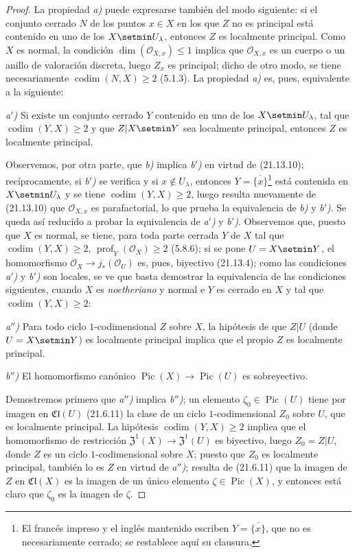 \begin{proof}
La propiedad \emph{a)} puede expresarse también del modo siguiente: si el conjunto cerrado
$N$ de los puntos $x\in X$ en los que $Z$ no es principal está contenido en uno de los
$X\setmin U_\lambda$, entonces $Z$ es localmente principal. Como $X$ es normal, la condición
$\dim(\mathcal O_{X,x})\leq1$ implica que $\mathcal O_{X,x}$ es un cuerpo o un
anillo de valoración discreta, luego $Z_x$ es principal; dicho de otro modo, se tiene
necesariamente $\operatorname{codim}(N,X)\geq2$ (5.1.3). La propiedad \emph{a)} es, pues,
equivalente a la siguiente:

\emph{a$'$)} Si existe un conjunto cerrado $Y$ contenido en uno de los $X\setmin U_\lambda$, tal
que $\operatorname{codim}(Y,X)\geq2$ y que $Z|X\setmin Y$ sea localmente principal,
entonces $Z$ es localmente principal.

Observemos, por otra parte, que \emph{b)} implica \emph{b$'$)} en virtud de (21.13.10); recíprocamente, si
\emph{b$'$)} se verifica y si $x\notin U_\lambda$, entonces $Y=\overline{\{x\}}$\footnote{El francés impreso y el inglés mantenido escriben $Y=\overline{\{x\}}$,
que no es necesariamente cerrado; se restablece aquí su clausura.} está contenida en
$X\setmin U_\lambda$ y se tiene $\operatorname{codim}(Y,X)\geq2$, luego resulta nuevamente de
(21.13.10) que $\mathcal O_{X,x}$ es parafactorial, lo que prueba la equivalencia de
\emph{b)} y \emph{b$'$)}. Se queda así reducido a probar la equivalencia de \emph{a$'$)} y \emph{b$'$)}.
Observemos que, puesto que $X$ es normal, se tiene, para toda parte cerrada $Y$ de $X$ tal que
$\operatorname{codim}(Y,X)\geq2$, $\operatorname{prof}_Y(\mathcal O_X)\geq2$
(5.8.6); si se pone $U=X\setmin Y$, el homomorfismo
$\mathcal O_X\to j_*(\mathcal O_U)$ es, pues, biyectivo (21.13.4); como las condiciones
\emph{a$'$)} y \emph{b$'$)} son locales, se ve que basta demostrar la equivalencia de las
condiciones siguientes, cuando $X$ es \emph{noetheriano} y normal e $Y$ es cerrado en $X$ y
tal que $\operatorname{codim}(Y,X)\geq2$:

\emph{a$''$)} Para todo ciclo $1$-codimensional $Z$ sobre $X$, la hipótesis de que $Z|U$
(donde $U=X\setmin Y$) es localmente principal implica que el propio $Z$ es localmente
principal.

\emph{b$''$)} El homomorfismo canónico
$\operatorname{Pic}(X)\to\operatorname{Pic}(U)$ es sobreyectivo.

Demostremos primero que \emph{a$''$)} implica \emph{b$''$)}; un elemento
$\zeta_0\in\operatorname{Pic}(U)$ tiene por imagen en $\mathfrak{Cl}(U)$ (21.6.11) la
clase de un ciclo $1$-codimensional $Z_0$ sobre $U$, que es localmente principal.
La hipótesis $\operatorname{codim}(Y,X)\geq2$ implica que el homomorfismo de
restricción $\mathfrak{Z}^1(X)\to\mathfrak{Z}^1(U)$ es biyectivo, luego $Z_0=Z|U$, donde $Z$
es un ciclo $1$-codimensional sobre $X$; puesto que $Z_0$ es localmente principal, también lo
es $Z$ en virtud de \emph{a$''$)}; resulta de (21.6.11) que la imagen de $Z$ en
$\mathfrak{Cl}(X)$ es la imagen de un único elemento $\zeta\in\operatorname{Pic}(X)$,
y entonces está claro que $\zeta_0$ es la imagen de $\zeta$.


\end{proof}
